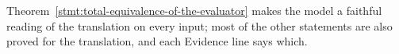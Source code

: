 Theorem~\ref{stmt:total-equivalence-of-the-evaluator} makes the model a faithful
reading of the translation on every input; most of the other statements are also
proved for the translation, and each Evidence line says which.





